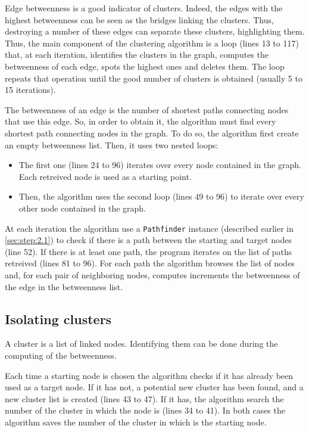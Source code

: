 \documentclass[12pt,english]{article}
\begin{document}
	Edge betweenness is a good indicator of clusters.
	Indeed, the edges with the highest betweenness can be seen as the bridges linking the clusters.
	Thus, destroying a number of these edges can separate these clusters, highlighting them.\\
	Thus, the main component of the clustering algorithm is a loop (lines 13 to 117) that, at each iteration,
	identifies the clusters in the graph, computes the betweenness of each edge, spots the highest ones and deletes them.
	The loop repeats that operation until the good number of clusters is obtained (usually 5 to 15 iterations).

	The betweenness of an edge is the number of shortest paths connecting nodes that use this edge.
	So, in order to obtain it, the algorithm must find every shortest path connecting nodes in the graph.
	To do so, the algorithm first create an empty betweenness list.
	Then, it uses two nested loops:
	\begin{itemize}
		\item The first one (lines 24 to 96) iterates over every node contained in the graph. Each retreived node is used as a starting point.
		\item Then, the algorithm uses the second loop (lines 49 to 96) to iterate over every other node contained in the graph.
	\end{itemize}

	At each iteration the algorithm use a \texttt{Pathfinder} instance (described earlier in \autoref{sec:step:2.1}) to check if there is a path between the starting and target nodes (line 52).
	If there is at least one path, the program iterates on the list of paths retreived (lines 81 to 96).
	For each path the algorithm browses the list of nodes and, for each pair of neighboring nodes, computes increments the betweenness of the edge in the betweenness list.

	\subsection{Isolating clusters}\label{sec:step:3.2}

	A cluster is a list of linked nodes.
	Identifying them can be done during the computing of the betweenness.

	Each time a starting node is chosen the algorithm checks if it has already been used as a target node.
	If it has not, a potential new cluster has been found, and a new cluster list is created (lines 43 to 47).
	If it has, the algorithm search the number of the cluster in which the node is (lines 34 to 41).
	In both cases the algorithm saves the number of the cluster in which is the starting node.
\end{document}
